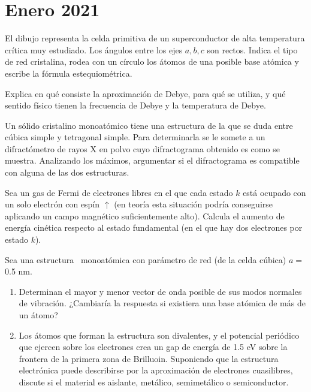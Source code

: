 \section*{Enero 2021}
\setcounter{section}{2} %

\begin{ejercicio}
	El dibujo representa la celda primitiva de un superconductor de alta temperatura crítica muy estudiado. Los ángulos entre los ejes $a,b,c$ son rectos. Indica el tipo de red cristalina, rodea con un círculo los átomos de una posible base atómica y escribe la fórmula estequiométrica. 
\end{ejercicio}

\begin{ejercicio}
	Explica en qué consiste la aproximación de Debye, para qué se utiliza, y qué sentido físico tienen la frecuencia de Debye y la temperatura de Debye.
\end{ejercicio}

\begin{ejercicio}
	Un sólido cristalino monoatómico tiene una estructura de la que se duda entre cúbica simple y tetragonal simple. Para determinarla se le somete a un difractómetro de rayos X en polvo cuyo difractograma obtenido es como se muestra. Analizando los máximos, argumentar si el difractograma es compatible con alguna de las dos estructuras.
\end{ejercicio}

\begin{ejercicio}
	Sea un gas de Fermi de electrones libres en el que cada estado $k$ está ocupado con un solo electrón con espín $\uparrow$ (en teoría esta situación podría conseguirse aplicando un campo magnético suficientemente alto). Calcula el aumento de energía cinética respecto al estado fundamental (en el que hay dos electrones por estado $k$).
\end{ejercicio}

\begin{ejercicio}
	Sea una estructura \bcc \ monoatómica con parámetro de red (de la celda cúbica) $a=$0.5 nm. 
	\begin{enumerate}[label=\alph*)]
		\item Determinan el mayor y menor vector de onda posible de sus modos normales de vibración. ¿Cambiaría la respuesta si existiera una base atómica de más de un átomo?
		\item Los átomos que forman la estructura son divalentes, y el potencial periódico que ejercen sobre los electrones crea un gap de energía de 1.5 eV sobre la frontera de la primera zona de Brilluoin. Suponiendo que la estructura electrónica puede describirse por la aproximación de electrones cuasilibres, discute si el material es aislante, metálico, semimetálico o semiconductor.
	\end{enumerate}
\end{ejercicio}

